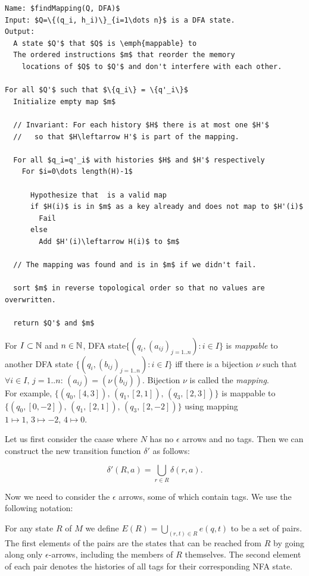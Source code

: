 \documentclass[english]{sigplanconf}
\theoremstyle{definition}
\begin{document}
\begin{algorithm*}
\begin{lstlisting}[mathescape]
Name: $findMapping(Q, DFA)$
Input: $Q=\{(q_i, h_i)\}_{i=1\dots n}$ is a DFA state.
Output: 
  A state $Q'$ that $Q$ is \emph{mappable} to
  The ordered instructions $m$ that reorder the memory 
    locations of $Q$ to $Q'$ and don't interfere with each other.
    
For all $Q'$ such that $\{q_i\} = \{q'_i\}$
  Initialize empty map $m$
  
  // Invariant: For each history $H$ there is at most one $H'$
  //   so that $H\leftarrow H'$ is part of the mapping.
  
  For all $q_i=q'_i$ with histories $H$ and $H'$ respectively
    For $i=0\dots length(H)-1$
    
      Hypothesize that  is a valid map
      if $H(i)$ is in $m$ as a key already and does not map to $H'(i)$
        Fail
      else
        Add $H'(i)\leftarrow H(i)$ to $m$
        
  // The mapping was found and is in $m$ if we didn't fail.
  
  sort $m$ in reverse topological order so that no values are overwritten.
  
  return $Q'$ and $m$
\end{lstlisting}
\end{algorithm*}

For $I\subset\mathbb{N}$ and $n\in\mathbb{N}$, DFA state$\{(q_{i},(a_{ij})_{j=1..n}):i\in I\}$
is \emph{mappable} to another DFA state $\{(q_{i},(b_{ij})_{j=1..n}):i\in I\}$
iff there is a bijection $\nu$ such that $\forall i\in I,\, j=1..n:\,(a_{ij})=(\nu(b_{ij}))$.
Bijection $\nu$ is called the \emph{mapping}.\\
For example, $\{(q_{0},[4,3]),\,(q_{1},[2,1]),\,(q_{3},[2,3])\}$
is mappable to $\{(q_{0},[0,-2]),\,(q_{1},[2,1]),\,(q_{3},[2,-2])\}$
using mapping $1\mapsto1,\,3\mapsto-2,\,4\mapsto0$.

Let us first consider the caase where $N$ has no $\epsilon$ arrows
and no tags. Then we can construct the new transition function $\delta'$
as follows:

\[
\delta'(R,a)=\bigcup_{r\in R}\delta(r,a)\mbox{.}
\]

Now we need to consider the $\epsilon$ arrows, some of which contain
tags. We use the following notation:

For any state $R$ of $M$ we define $E(R)=\bigcup_{(r,t)\in R}e(q,t)$
to be a set of pairs. The first elements of the pairs are the states
that can be reached from $R$ by going along only $\epsilon$-arrows,
including the members of $R$ themselves. The second element of each
pair denotes the histories of all tags for their corresponding
NFA state.
\end{document}
